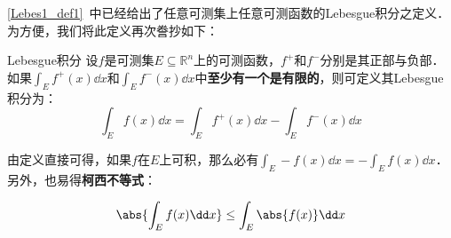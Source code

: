 

\autoref{Lebes1_def1}~中已经给出了任意可测集上任意可测函数的Lebesgue积分之定义．为方便，我们将此定义再次誊抄如下：

\begin{definition}{Lebesgue积分}
设$f$是可测集$E\subseteq\mathbb{R}^n$上的可测函数，$f^+$和$f^-$分别是其正部与负部．如果$\int_E f^+(x) \dd x$和$\int_E f^-(x) \dd x$中\textbf{至少有一个是有限的}，则可定义其Lebesgue积分为：
\begin{equation}
\int_E f(x) \dd x = \int_E f^+(x) \dd x - \int_E f^-(x) \dd x
\end{equation}
\end{definition}

由定义直接可得，如果$f$在$E$上可积，那么必有$\int_E -f(x) \dd x = -\int_E f(x) \dd x$．另外，也易得\textbf{柯西不等式}：

\begin{equation}
\abs{\int_E f(x) \dd x} \leq \int_E \abs{f(x)} \dd x
\end{equation}
















